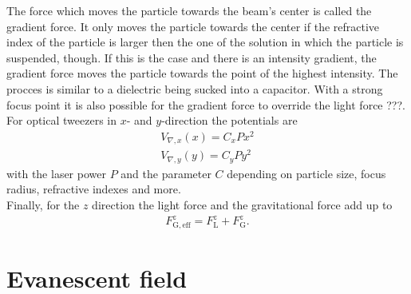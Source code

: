 \documentclass[.../bericht]{subfilies}
\begin{document}
        The force which moves the particle towards the beam's center is called the gradient force. It only moves the particle towards the center if the refractive index of the particle is larger then the one of the solution in which the particle is suspended, though. If this is the case and there is an intensity gradient, the gradient force moves the particle towards the point of the highest intensity. The procces is similar to a dielectric being sucked into a capacitor. With a strong focus point it is also possible for the gradient force to override the light force ???. For optical tweezers in $x$- and $y$-direction the potentials are
        \begin{align}
          V_{\nabla,x}(x)=C_xPx^2\\
          V_{\nabla,y}(y)=C_yPy^2
        \end{align}
        with the laser power $P$ and the parameter $C$ depending on particle size, focus radius, refractive indexes and more. \\
        Finally, for the $z$ direction the light force and the gravitational force add up to
        \begin{align}
          F_\mathrm{G,eff}^z=F_\mathrm{L}^z+F_\mathrm{G}^z.
        \end{align}


      \section{Evanescent field}
      \label{sec:evanenscent}
\end{document}

